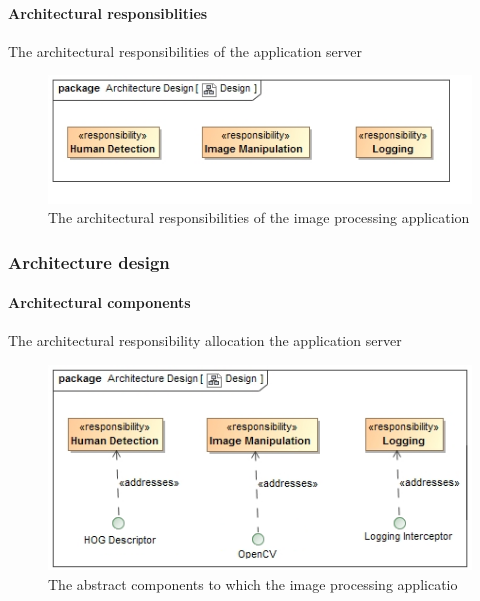 \documentclass[a4paper,12pt]{report}
\begin{document}
			\FloatBarrier
			\paragraph {Architectural responsiblities}
				\hfill \break
				The architectural responsibilities of the 	application server
				\begin{figure}[H]
					\centering
					\includegraphics  [scale=0.8]{../Diagrams/applicationServerResponsibiltiesZ.jpg}
					\caption{The architectural responsibilities of the image processing application}
				\end{figure}		
		
		\subsubsection {Architecture design}	
			\FloatBarrier	
			\paragraph {Architectural components}
			\hfill \break
				The architectural responsibility allocation the application server			
				\begin{figure}[htb]
					\centering
					\includegraphics [scale=0.5]{../Diagrams/applicationServerResponsibiltiesAllocationZ.png}
					\caption{The abstract components to which the  image processing applicatio}
				\end{figure}
			
			\newpage
\end{document}
